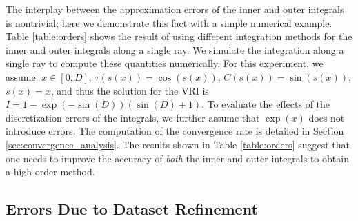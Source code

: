 The interplay between the approximation errors of the inner and outer integrals is nontrivial; 
  here we demonstrate this fact with a simple numerical example.  Table \ref{table:orders} shows the
  result of using different integration methods for the inner and outer integrals along a 
  single ray. We simulate the integration along a single ray to compute these quantities
  numerically. For this experiment, we assume:
  $x \in [0,D]$, $\tau(s(x)) = \cos(s(x))$, $C(s(x)) = \sin(s(x))$, $s(x) = x$, 
  and thus the solution for the VRI is $I = 1-\exp{(-\sin(D))}(\sin(D)+1)$. 
  To evaluate the effects of the discretization errors of the integrals, 
  we further assume that $\exp(x)$ does not introduce errors.  
  The computation of the convergence rate is detailed in Section \ref{sec:convergence_analysis}. The results shown in Table \ref{table:orders} suggest
  that one needs to improve the accuracy of \emph{both} the inner and outer integrals to obtain a
  high order method.  

\subsection{Errors Due to Dataset Refinement}
\label{sec:VerViaDatasetRefinement}


